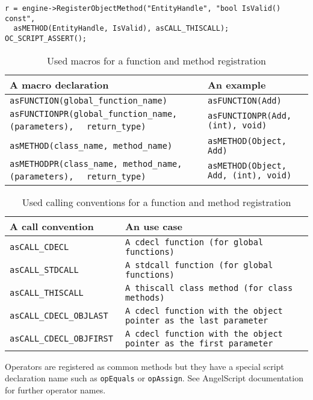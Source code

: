 {\footnotesize\begin{verbatim}
r = engine->RegisterObjectMethod("EntityHandle", "bool IsValid() const",
  asMETHOD(EntityHandle, IsValid), asCALL_THISCALL); OC_SCRIPT_ASSERT();
\end{verbatim}}

\begin{table}[htbp]
	\centering
		{\scriptsize
		\begin{tabular}{|p{0.55\hsize}|p{0.38\hsize}|}
		\hline
		A macro declaration & An example\\
		\hline
		\verb/asFUNCTION(global_function_name)/ & \verb/asFUNCTION(Add)/\\
		\verb/asFUNCTIONPR(global_function_name, (parameters),/ \verb/  return_type)/ & \verb/asFUNCTIONPR(Add, (int), void)/\\
		\verb/asMETHOD(class_name, method_name)/ & \verb/asMETHOD(Object, Add)/\\
		\verb/asMETHODPR(class_name, method_name, (parameters),/ \verb/  return_type)/ & \verb/asMETHOD(Object, Add, (int), void)/\\
		\hline
		\end{tabular}
		}
	\caption{Used macros for a function and method registration}
	\label{tab:script-macros}
\end{table}

\begin{table}[htbp]
	\centering
		{\scriptsize
		\begin{tabular}{|p{0.24\hsize}|p{0.69\hsize}|}
		\hline
		A call convention & An use case\\
		\hline
		\verb/asCALL_CDECL/ & \verb/A cdecl function (for global functions)/\\
		\verb/asCALL_STDCALL/ & \verb/A stdcall function (for global functions)/\\
		\verb/asCALL_THISCALL / & \verb/A thiscall class method (for class methods)/\\
		\verb/asCALL_CDECL_OBJLAST / & \verb/A cdecl function with the object pointer as the last parameter/\\
		\verb/asCALL_CDECL_OBJFIRST / & \verb/A cdecl function with the object pointer as the first parameter/\\
		\hline
		\end{tabular}
		}
	\caption{Used calling conventions for a function and method registration}
	\label{tab:script-conventions}
\end{table}

Operators are registered as common methods but they have a special script declaration name such as \verb/opEquals/ or \verb/opAssign/. See AngelScript documentation \cite{angelscript} for further operator names.

